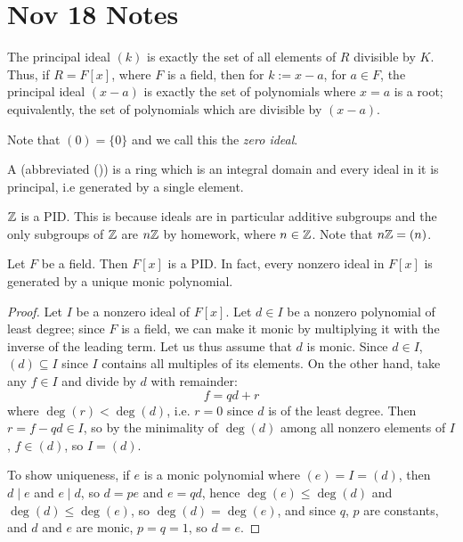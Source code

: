 \newpage
\section{Nov 18 Notes}

\begin{remark}
    The principal ideal $(k)$ is exactly the set of all elements of $R$ divisible by $K$. Thus, if $R = F[x]$, where $F$ is a field, then for $k := x - a$, for $a \in F$, the principal ideal $(x-a)$ is exactly the set of polynomials where $x = a$ is a root; equivalently, the set of polynomials which are divisible by $(x - a)$.
    
    Note that $(0) = \{0\}$ and we call this the \textit{zero ideal}.
\end{remark}

\begin{defbox}
    A  (abbreviated ()) is a ring which is an integral domain and every ideal in it is principal, i.e generated by a single element. 
\end{defbox}

\begin{example}
    $\mathbb{Z}$ is a PID. This is because ideals are in particular additive subgroups and the only subgroups of $\mathbb{Z}$ are $n\mathbb{Z}$ by homework, where $n \in \mathbb{Z}$. Note that $n\mathbb{Z} = (n)$.
\end{example}

\begin{thmbox}
    Let $F$ be a field. Then $F[x]$ is a PID. In fact, every nonzero ideal in $F[x]$ is generated by a unique monic polynomial.
\end{thmbox}

\begin{proof}
    Let $I$ be a nonzero ideal of $F[x]$. Let $d \in I$ be a nonzero polynomial of least degree; since $F$ is a field, we can make it monic by multiplying it with the inverse of the leading term. Let us thus assume that $d$ is monic. Since $d \in I$, $(d) \subseteq I$ since $I$ contains all multiples of its elements. On the other hand, take any $f \in I$ and divide by $d$ with remainder:
    \[ f = qd + r \]
    where $\deg(r) < \deg(d)$, i.e. $r = 0$ since $d$ is of the least degree. Then $r = f - qd \in I$, so by the minimality of $\deg(d)$ among all nonzero elements of $I$, $f \in (d)$, so $I = (d)$.

    To show uniqueness, if $e$ is a monic polynomial where $(e) = I = (d)$, then $d \mid e$ and $e \mid d$, so $d = pe$ and $e = qd$, hence $\deg(e) \leq \deg(d)$ and $\deg(d) \leq \deg(e)$, so $\deg(d) = \deg(e)$, and since $q$, $p$ are constants, and $d$ and $e$ are monic, $p = q = 1$, so $d = e$.
\end{proof}


